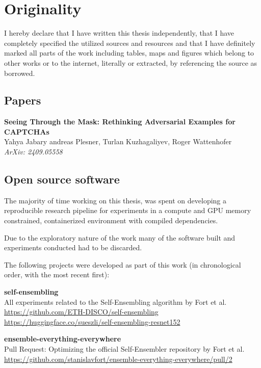 \documentclass[a4paper, oneside]{discothesis}
\newcommand{\linebreaks}{\vspace*{0.5em}}
\begin{document}
\chapter*{Originality}

I hereby declare that I have written this thesis independently, that I have completely specified the utilized sources and resources and that I have definitely marked all parts of the work \textendash{} including tables, maps and figures \textendash{} which belong to other works or to the internet, literally or extracted, by referencing the source as borrowed.

\section*{Papers}

\textbf{Seeing Through the Mask: Rethinking Adversarial Examples for CAPTCHAs} \\
Yahya Jabary andreas Plesner, Turlan Kuzhagaliyev, Roger Wattenhofer \\
\textit{ArXiv: 2409.05558}

\section*{Open source software}

The majority of time working on this thesis, was spent on developing a reproducible research pipeline for experiments in a compute and GPU memory constrained, containerized environment with compiled dependencies.

Due to the exploratory nature of the work many of the software built and experiments conducted had to be discarded.

The following projects were developed as part of this work (in chronological order, with the most recent first):

\linebreaks

\textbf{self-ensembling} \\
All experiments related to the Self-Ensembling algorithm by Fort et al. \\
\url{https://github.com/ETH-DISCO/self-ensembling} \\
\url{https://huggingface.co/sueszli/self-ensembling-resnet152}

\linebreaks

\textbf{ensemble-everything-everywhere} \\
Pull Request: Optimizing the official Self-Ensembler repository by Fort et al. \\
\url{https://github.com/stanislavfort/ensemble-everything-everywhere/pull/2}
\end{document}
